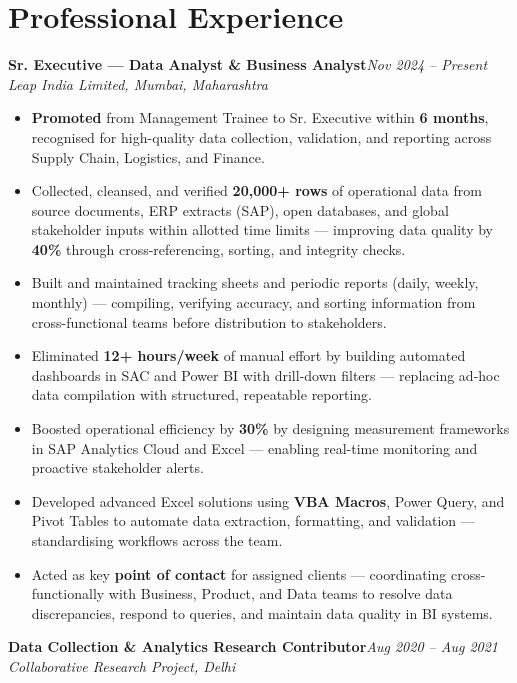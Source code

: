\documentclass[10pt, letterpaper]{article}
\newcommand{\role}[3]{%
  \vspace{2pt}%
  {\bfseries #1}\hfill{\small\color{muted}\textit{#3}}\\[-2pt]%
  {\small\color{muted}\textit{#2}}%
}
\begin{document}
\section{Professional Experience}

\role{Sr. Executive — Data Analyst \& Business Analyst}{Leap India Limited, Mumbai, Maharashtra}{Nov 2024 – Present}

\begin{itemize}
  \item \textbf{Promoted} from Management Trainee to Sr. Executive within \textbf{6 months}, recognised for high-quality data collection, validation, and reporting across Supply Chain, Logistics, and Finance.
  \item Collected, cleansed, and verified \textbf{20,000+ rows} of operational data from source documents, ERP extracts (SAP), open databases, and global stakeholder inputs within allotted time limits — improving data quality by \textbf{40\%} through cross-referencing, sorting, and integrity checks.
  \item Built and maintained tracking sheets and periodic reports (daily, weekly, monthly) — compiling, verifying accuracy, and sorting information from cross-functional teams before distribution to stakeholders.
  \item Eliminated \textbf{12+ hours/week} of manual effort by building automated dashboards in SAC and Power BI with drill-down filters — replacing ad-hoc data compilation with structured, repeatable reporting.
  \item Boosted operational efficiency by \textbf{30\%} by designing measurement frameworks in SAP Analytics Cloud and Excel — enabling real-time monitoring and proactive stakeholder alerts.
  \item Developed advanced Excel solutions using \textbf{VBA Macros}, Power Query, and Pivot Tables to automate data extraction, formatting, and validation — standardising workflows across the team.
  \item Acted as key \textbf{point of contact} for assigned clients — coordinating cross-functionally with Business, Product, and Data teams to resolve data discrepancies, respond to queries, and maintain data quality in BI systems.
\end{itemize}

\vspace{1pt}

\role{Data Collection \& Analytics Research Contributor}{Collaborative Research Project, Delhi}{Aug 2020 – Aug 2021}
\end{document}
